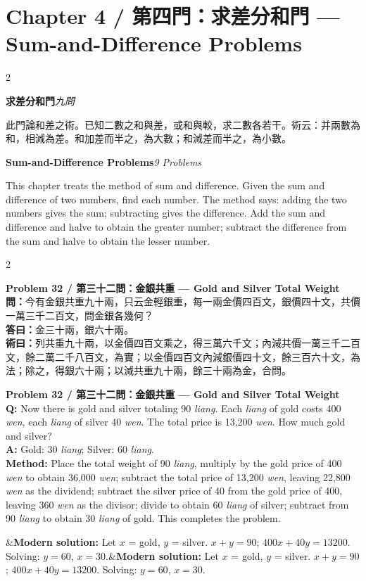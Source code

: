 \documentclass[11pt,a4paper]{article}
\newcommand{\bilingualproblem}[4]{%
  \begin{paracol}{2}
  \begin{leftcolumn}
  \noindent\textbf{\color{problemcolor}#1}\\[0.2cm]
  #2
  \end{leftcolumn}
  \switchcolumn
  \noindent\textbf{\color{problemcolor}#1}\\[0.2cm]
  #3
  \end{paracol}
  \ifx&#4&\else\vspace{0.3cm}\noindent#4\fi
  \vspace{0.5cm}
}
\newcommand{\wen}[1]{\textcolor{problemcolor}{\textbf{問：}}#1}
\newcommand{\da}[1]{\textcolor{answercolor}{\textbf{答曰：}}#1}
\newcommand{\shu}[1]{\textcolor{methodcolor}{\textbf{術曰：}}#1}
\newcommand{\wenen}[1]{\textcolor{problemcolor}{\textbf{Q:}} #1}
\newcommand{\daen}[1]{\textcolor{answercolor}{\textbf{A:}} #1}
\newcommand{\shuen}[1]{\textcolor{methodcolor}{\textbf{Method:}} #1}
\begin{document}
\newpage

\section{Chapter 4 / 第四門：求差分和門 --- Sum-and-Difference Problems}
\label{sec:qiucha}

\begin{paracol}{2}
\begin{leftcolumn}
\noindent\textbf{求差分和門}\quad\textit{九問}

此門論和差之術。已知二數之和與差，或和與較，求二數各若干。術云：并兩數為和，相減為差。和加差而半之，為大數；和減差而半之，為小數。
\end{leftcolumn}

\switchcolumn

\noindent\textbf{Sum-and-Difference Problems}\quad\textit{9 Problems}

This chapter treats the method of sum and difference. Given the sum and difference of two numbers, find each number. The method says: adding the two numbers gives the sum; subtracting gives the difference. Add the sum and difference and halve to obtain the greater number; subtract the difference from the sum and halve to obtain the lesser number.
\end{paracol}

\vspace{0.5cm}

\bilingualproblem{Problem 32 / 第三十二問：金銀共重 --- Gold and Silver Total Weight}{
\wen{今有金銀共重九十兩，只云金輕銀重，每一兩金價四百文，銀價四十文，共價一萬三千二百文，問金銀各幾何？}\\[0.2cm]
\da{金三十兩，銀六十兩。}\\[0.2cm]
\shu{列共重九十兩，以金價四百文乘之，得三萬六千文；內減共價一萬三千二百文，餘二萬二千八百文，為實；以金價四百文內減銀價四十文，餘三百六十文，為法；除之，得銀六十兩；以減共重九十兩，餘三十兩為金，合問。}
}{
\wenen{Now there is gold and silver totaling 90 \textit{liang}. Each \textit{liang} of gold costs 400 \textit{wen}, each \textit{liang} of silver 40 \textit{wen}. The total price is 13,200 \textit{wen}. How much gold and silver?}\\[0.2cm]
\daen{Gold: 30 \textit{liang}; Silver: 60 \textit{liang}.}\\[0.2cm]
\shuen{Place the total weight of 90 \textit{liang}, multiply by the gold price of 400 \textit{wen} to obtain 36,000 \textit{wen}; subtract the total price of 13,200 \textit{wen}, leaving 22,800 \textit{wen} as the dividend; subtract the silver price of 40 from the gold price of 400, leaving 360 \textit{wen} as the divisor; divide to obtain 60 \textit{liang} of silver; subtract from 90 \textit{liang} to obtain 30 \textit{liang} of gold. This completes the problem.}
}{\textbf{Modern solution:} Let $x$ = gold, $y$ = silver. $x + y = 90$; $400x + 40y = 13200$. Solving: $y = 60$, $x = 30$.}
\end{document}
